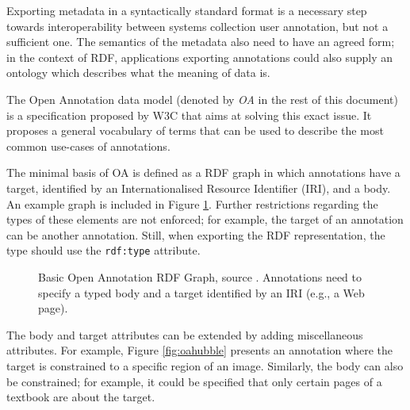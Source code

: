 
Exporting metadata in a syntactically standard format is a necessary step
towards interoperability between systems collection user annotation, but not a
sufficient one. The semantics of the metadata also need to have an agreed form;
in the context of RDF, applications exporting annotations could also supply an
ontology which describes what the meaning of data is.

The Open Annotation \cite{ref:oa} data model (denoted by \textit{OA} in the
rest of this document) is a specification proposed by W3C that aims at solving
this exact issue. It proposes a general vocabulary of terms that can be used to
describe the most common use-cases of annotations.

The minimal basis of OA is defined as a RDF graph in which annotations have a
target, identified by an Internationalised Resource Identifier (IRI), and a
body. An example graph is included in Figure \ref{fig:oa}. Further restrictions
regarding the types of these elements are not enforced; for example, the target
of an annotation can be another annotation. Still, when exporting the RDF
representation, the type should use the \texttt{rdf:type} attribute.

\begin{figure}[!ht]
  \centering
  \caption[Basic Open Annotation RDF Graph]
          {Basic Open Annotation RDF Graph, source \cite{ref:oa}. Annotations
           need to specify a typed body and a target identified by an IRI
           (e.g., a Web page).}
  \label{fig:oa}
\end{figure}

The body and target attributes can be extended by adding miscellaneous attributes.
For example, Figure \ref{fig:oahubble} presents an annotation where the target
is constrained to a specific region of an image. Similarly, the body can also
be constrained; for example, it could be specified that only certain pages of
a textbook are about the target.

